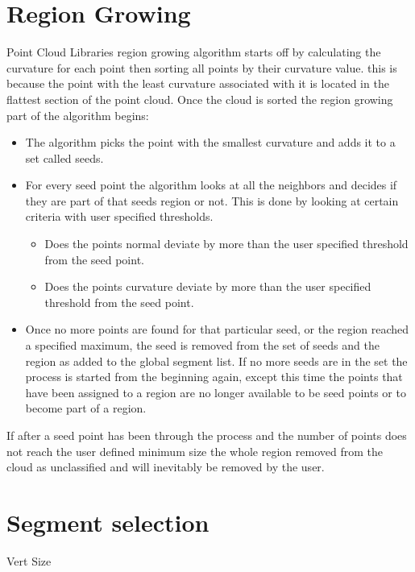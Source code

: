 	
	\section{Region Growing}
	Point Cloud Libraries region growing algorithm starts off by calculating the curvature for each point then sorting all points by their curvature value. this is because the point with the least curvature associated with it is located in the flattest section of the point cloud. Once the cloud is sorted the region growing part of the algorithm begins:
	
	\renewcommand\labelitemi{{\boldmath$\cdot$}}
	\begin{itemize}
		\item The algorithm picks the point with the smallest curvature and adds it to a set called seeds.
		
		\item For every seed point the algorithm looks at all the neighbors and decides if they are part of that seeds region or not. This is done by looking at certain criteria with user specified thresholds.
		
		\begin{itemize}
			\item Does the points normal deviate by more than the user specified threshold from the seed point.
			
			\item Does the points curvature deviate by more than the user specified threshold from the seed point.
			
		\end{itemize}
		
		\item Once no more points are found for that particular seed, or the region reached a specified maximum, the seed is removed from the set of seeds and the region as added to the global segment list. If no more seeds are in the set the process is started from the beginning again, except this time the points that have been assigned to a region are no longer available to be seed points or to become part of a region.
		
	\end{itemize}
	
	If after a seed point has been through the process and the number of points does not reach the user defined minimum size the whole region removed from the cloud as unclassified and will inevitably be removed by the user.
	
	\section{Segment selection}
		Vert
		Size
		
